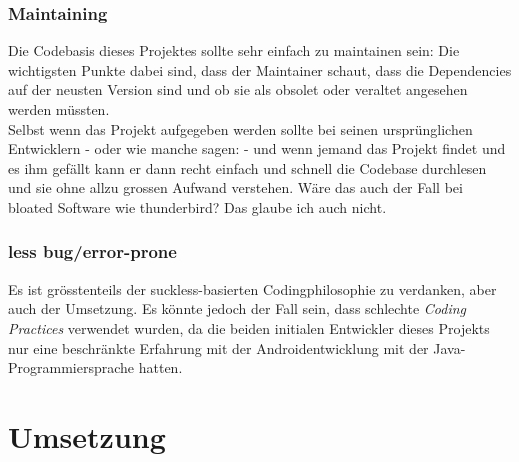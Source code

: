 \documentclass[a4paper,11pt]{article}
\begin{document}
\subsubsection{Maintaining}
Die Codebasis dieses Projektes sollte sehr einfach zu maintainen sein: Die wichtigsten Punkte dabei sind, dass der Maintainer schaut, dass die Dependencies auf der neusten Version sind und ob sie als obsolet oder veraltet angesehen werden müssten.\\

Selbst wenn das Projekt aufgegeben werden sollte bei seinen ursprünglichen Entwicklern - oder wie manche sagen:  - und wenn jemand das Projekt findet und es ihm gefällt kann er dann recht einfach und schnell die Codebase durchlesen und sie ohne allzu grossen Aufwand verstehen. Wäre das auch der Fall bei bloated Software wie thunderbird? Das glaube ich auch nicht.

\subsubsection{less bug/error-prone}
Es ist grösstenteils der suckless-basierten Codingphilosophie zu verdanken, aber auch der Umsetzung. Es könnte jedoch der Fall sein, dass schlechte \textit{Coding Practices} verwendet wurden, da die beiden initialen Entwickler dieses Projekts nur eine beschränkte Erfahrung mit der Androidentwicklung mit der Java-Programmiersprache hatten.

\section{Umsetzung}
\end{document}
